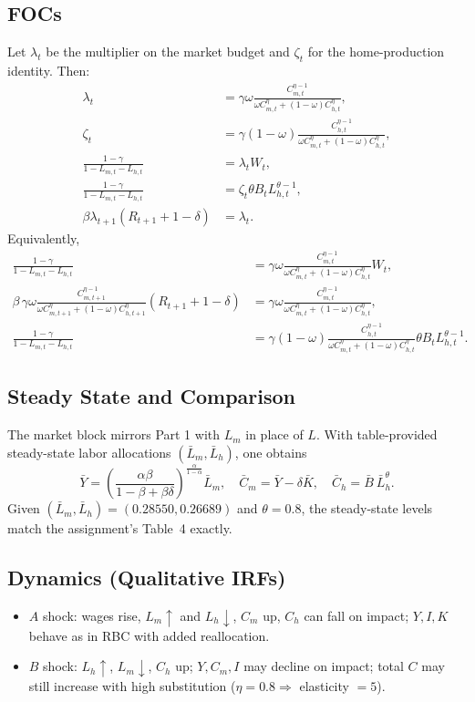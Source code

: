 \documentclass[a4paper,12pt]{article}
\theoremstyle{nonitalic}
\begin{document}
\subsection{FOCs}
Let $\lambda_t$ be the multiplier on the market budget and $\zeta_t$ for the home-production identity. Then:
\begin{align}
\lambda_t &= \gamma \omega \frac{C_{m,t}^{\eta-1}}{\omega C_{m,t}^{\eta}+(1-\omega)C_{h,t}^{\eta}},\\
\zeta_t &= \gamma (1-\omega) \frac{C_{h,t}^{\eta-1}}{\omega C_{m,t}^{\eta}+(1-\omega)C_{h,t}^{\eta}},\\
\frac{1-\gamma}{1-L_{m,t}-L_{h,t}} &= \lambda_t W_t,\\
\frac{1-\gamma}{1-L_{m,t}-L_{h,t}} &= \zeta_t \theta B_t L_{h,t}^{\theta-1},\\
\beta \lambda_{t+1}(R_{t+1}+1-\delta) &= \lambda_t.
\end{align}
Equivalently,
\begin{align}
\frac{1-\gamma}{1-L_{m,t}-L_{h,t}} 
&= \gamma \omega \frac{C_{m,t}^{\eta-1}}{\omega C_{m,t}^{\eta} + (1-\omega)C_{h,t}^{\eta}} W_t,\\
\beta\,\gamma \omega \frac{C_{m,t+1}^{\eta-1}}{\omega C_{m,t+1}^{\eta}+(1-\omega)C_{h,t+1}^{\eta}}(R_{t+1}+1-\delta)
&= \gamma \omega \frac{C_{m,t}^{\eta-1}}{\omega C_{m,t}^{\eta}+(1-\omega)C_{h,t}^{\eta}},\\
\frac{1-\gamma}{1-L_{m,t}-L_{h,t}}
&= \gamma (1-\omega) \frac{C_{h,t}^{\eta-1}}{\omega C_{m,t}^{\eta}+(1-\omega)C_{h,t}^{\eta}} \theta B_t L_{h,t}^{\theta-1}.
\end{align}

\subsection{Steady State and Comparison}
The market block mirrors Part 1 with $L_m$ in place of $L$. With table-provided steady-state labor allocations $(\bar L_m,\bar L_h)$,
one obtains
\begin{equation}
\bar Y=\left(\frac{\alpha\beta}{1-\beta+\beta\delta}\right)^{\frac{\alpha}{1-\alpha}} \bar L_m,\quad
\bar C_m=\bar Y-\delta \bar K,\quad
\bar C_h=\bar B\ \bar L_h^{\theta}.
\end{equation}
Given $(\bar L_m,\bar L_h)=(0.28550,0.26689)$ and $\theta=0.8$, the steady-state levels match the assignment's Table~4 exactly.

\subsection{Dynamics (Qualitative IRFs)}
\begin{itemize}[nosep]
  \item $A$ shock: wages rise, $L_m\uparrow$ and $L_h\downarrow$, $C_m$ up, $C_h$ can fall on impact; $Y,I,K$ behave as in RBC with added reallocation.
  \item $B$ shock: $L_h\uparrow$, $L_m\downarrow$, $C_h$ up; $Y,C_m,I$ may decline on impact; total $C$ may still increase with high substitution ($\eta=0.8\Rightarrow$ elasticity $=5$).
\end{itemize}
\end{document}

